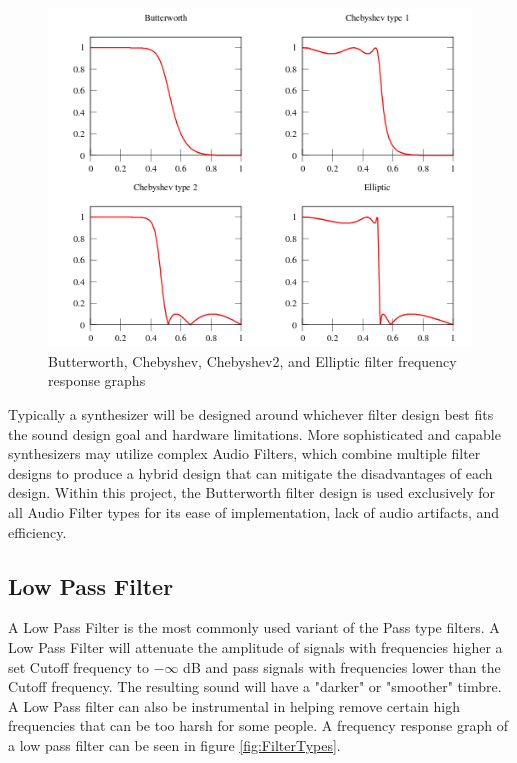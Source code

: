 \documentclass[a4paper,12pt]{report}
\begin{document}
\begin{figure}
    \centering
    \includegraphics[width=36em]{FilterDesigns.png}
    \caption{Butterworth, Chebyshev, Chebyshev2, and Elliptic filter frequency response graphs}
    \label{fig:FilterDesigns}
\end{figure}

Typically a synthesizer will be designed around whichever filter design best fits the sound design goal and hardware limitations. More sophisticated and capable synthesizers may utilize complex Audio Filters, which combine multiple filter designs to produce a hybrid design that can mitigate the disadvantages of each design. Within this project, the Butterworth filter design is used exclusively for all Audio Filter types for its ease of implementation, lack of audio artifacts, and efficiency.

\subsection{Low Pass Filter}
\label{subsec:lowpassfilter}
A Low Pass Filter is the most commonly used variant of the Pass type filters. A Low Pass Filter will attenuate the amplitude of signals with frequencies higher a set Cutoff frequency to $-\infty$ dB and pass signals with frequencies lower than the Cutoff frequency. The resulting sound will have a "darker" or "smoother" timbre. A Low Pass filter can also be instrumental in helping remove certain high frequencies that can be too harsh for some people. A frequency response graph of a low pass filter can be seen in figure \ref{fig:FilterTypes}.
\end{document}
